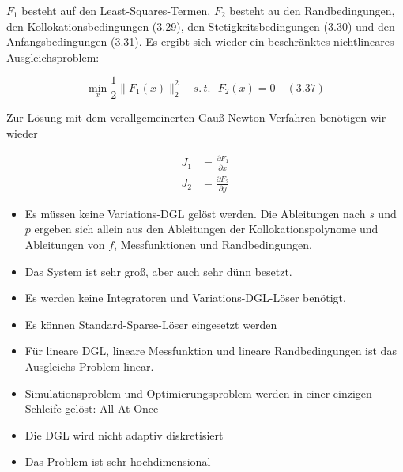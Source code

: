 $F_1$ besteht auf den Least-Squares-Termen, $F_2$ besteht au den Randbedingungen, den Kollokationsbedingungen (3.29), den Stetigkeitsbedingungen (3.30) und den Anfangsbedingungen (3.31). Es ergibt sich wieder ein beschränktes nichtlineares Ausgleichsproblem:

\[ \min_x \frac 12 \| F_1(x) \|_2^2 \quad s.\,t. \text{ } F_2(x) = 0 \quad (3.37) \]

Zur Lösung mit dem verallgemeinerten Gauß-Newton-Verfahren benötigen wir wieder

\begin{align*}
J_1 &= \frac{\partial F_1}{\partial x} \\
J_2 &= \frac{\partial F_2}{\partial y}
\end{align*}



\begin{itemize}
\item Es müssen keine Variations-DGL gelöst werden. Die Ableitungen nach $s$ und $p$ ergeben sich allein aus den Ableitungen der Kollokationspolynome und Ableitungen von $f$, Messfunktionen und Randbedingungen.
\item Das System ist sehr groß, aber auch sehr dünn besetzt.
\end{itemize}


\begin{itemize}
\item Es werden keine Integratoren und Variations-DGL-Löser benötigt.
\item Es können Standard-Sparse-Löser eingesetzt werden
\item Für lineare DGL, lineare Messfunktion und lineare Randbedingungen ist das Ausgleichs-Problem linear.
\item Simulationsproblem und Optimierungsproblem werden in einer einzigen Schleife gelöst: All-At-Once
\end{itemize}


\begin{itemize}
\item Die DGL wird nicht adaptiv diskretisiert
\item Das Problem ist sehr hochdimensional
\end{itemize}

